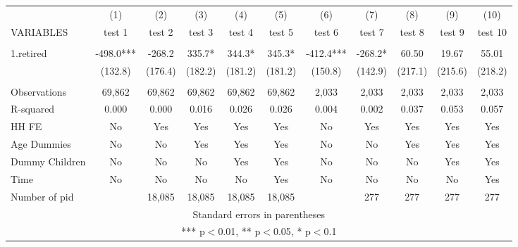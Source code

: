\begin{tabular}{lcccccccccc} \hline
 & (1) & (2) & (3) & (4) & (5) & (6) & (7) & (8) & (9) & (10) \\
VARIABLES & test 1 & test 2 & test 3 & test 4 & test 5 & test 6 & test 7 & test 8 & test 9 & test 10 \\ \hline
 &  &  &  &  &  &  &  &  &  &  \\
1.retired & -498.0*** & -268.2 & 335.7* & 344.3* & 345.3* & -412.4*** & -268.2* & 60.50 & 19.67 & 55.01 \\
 & (132.8) & (176.4) & (182.2) & (181.2) & (181.2) & (150.8) & (142.9) & (217.1) & (215.6) & (218.2) \\
 &  &  &  &  &  &  &  &  &  &  \\
Observations & 69,862 & 69,862 & 69,862 & 69,862 & 69,862 & 2,033 & 2,033 & 2,033 & 2,033 & 2,033 \\
R-squared & 0.000 & 0.000 & 0.016 & 0.026 & 0.026 & 0.004 & 0.002 & 0.037 & 0.053 & 0.057 \\
HH FE & No & Yes & Yes & Yes & Yes & No & Yes & Yes & Yes & Yes \\
Age Dummies & No & No & Yes & Yes & Yes & No & No & Yes & Yes & Yes \\
Dummy Children & No & No & No & Yes & Yes & No & No & No & Yes & Yes \\
Time & No & No & No & No & Yes & No & No & No & No & Yes \\
 Number of pid &  & 18,085 & 18,085 & 18,085 & 18,085 &  & 277 & 277 & 277 & 277 \\ \hline
\multicolumn{11}{c}{ Standard errors in parentheses} \\
\multicolumn{11}{c}{ *** p$<$0.01, ** p$<$0.05, * p$<$0.1} \\
\end{tabular}
